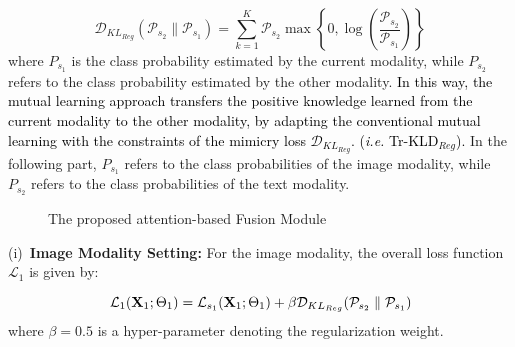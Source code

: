 \documentclass[twocolumn]{svjour3}
\newcommand{\ie}{\textit{i.e. }}
\begin{document}
\begin{equation}
\mathcal{D}_{{KL}_{Reg}}(\mathcal{P}_{{s}_{2}}\parallel{\mathcal{P}_{{s}_{1}}}) = \sum^{K}_{k=1}\mathcal{P}_{{s}_{2}}
\max\left\{0, \log\left(\frac{\mathcal{P}_{{s}_{2}}}{\mathcal{P}_{{s}_{1}}}\right)\right\}
\label{eq:equation14}
\end{equation}
where $P_{{s}_{1}}$ is the class probability estimated by the current modality, while $P_{{s}_{2}}$ refers to the class probability estimated by the other modality. \textcolor{black}{In this way, the mutual learning approach transfers the positive knowledge learned from the current modality to the other modality, by adapting the conventional mutual learning with the constraints of the mimicry loss $\mathcal{D}_{{KL}_{Reg}}$. (\ie Tr-KLD$_{Reg}$).} In the following part, $P_{{s}_{1}}$ refers to the class probabilities of the image modality, while $P_{{s}_{2}}$ refers to the class probabilities of the text modality. \\

\begin{figure*}[htb]
\centering
\begin{minipage}{.9\textwidth}
  \centering
  \quad
\end{minipage}
\hspace{0.1\linewidth}
\begin{minipage}{.9\textwidth}
  \centering
  \quad
\end{minipage}
\caption{The proposed attention-based Fusion Module}
\label{fig:Attention_module}

\end{figure*}

(i)\noindent~\textbf{Image Modality Setting:}
For the image modality, the overall loss function $\mathcal{L}_1$ is given by:    


\begin{equation}
\mathcal{L}_1(\mathbf{X}_1;\Theta_1) =
\mathcal{L}_{{s}_{1}}(\mathbf{X}_1;\Theta_1) + \\ \beta\mathcal{D}_{{KL}_{Reg}}(\mathcal{P}_{{s}_{2}}\parallel{\mathcal{P}_{{s}_{1}}})\! 
\label{eq:equation17}
\end{equation} 
where $\beta = 0.5 $ is a hyper-parameter denoting the regularization weight.
\end{document}
